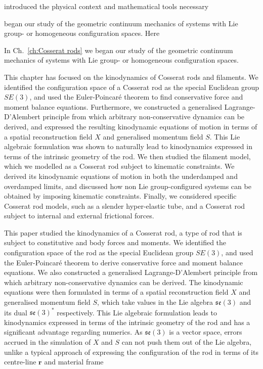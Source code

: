 \documentclass[]{cam-thesis}
\begin{document}
 introduced the physical context and mathematical tools necessary 

began our study of the geometric continuum mechanics of systems with Lie group- or homogeneous configuration spaces. Here 


In Ch.~\ref{ch:Cosserat rods} we began our study of the geometric continuum mechanics of systems with Lie group- or homogeneous configuration spaces. 

This chapter has focused on the kinodynamics of Cosserat rods and filaments. We identified the configuration space of a Cosserat rod as the special Euclidean group $SE(3)$, and used the Euler-Poincaré theorem to find conservative force and moment balance equations. Furthermore, we constructed a generalised Lagrange-D'Alembert principle from which arbitrary non-conservative dynamics can be derived, and expressed the resulting kinodynamic equations of motion in terms of a spatial reconstruction field $X$ and generalised momentum field $S$. This Lie algebraic formulation was shown to naturally lead to kinodynamics expressed in terms of the intrinsic geometry of the rod. We then studied the filament model, which we modelled as a Cosserat rod subject to kinematic constraints. We derived its kinodynamic equations of motion in both the underdamped and overdamped limits, and discussed how non Lie group-configured systems can be obtained by imposing kinematic constraints. Finally, we considered specific Cosserat rod models, such as a slender hyper-elastic tube, and a Cosserat rod subject to internal and external frictional forces.


This paper studied the kinodynamics of a Cosserat rod, a type of rod that is subject to constitutive and body forces and moments. We identified the configuration space of the rod as the special Euclidean group $SE(3)$, and used the Euler-Poincaré theorem to derive conservative force and moment balance equations. We also constructed a generalised Lagrange-D'Alembert principle from which arbitrary non-conservative dynamics can be derived. The kinodynamic equations were then formulated in terms of a spatial reconstruction field $X$ and generalised momentum field $S$, which take values in the Lie algebra $\mathfrak{se}(3)$ and its dual $\mathfrak{se}(3)^*$ respectively. This Lie algebraic formulation leads to kinodynamics expressed in terms of the intrinsic geometry of the rod and has a significant advantage regarding numerics. As $\mathfrak{se}(3)$ is a vector space, errors accrued in the simulation of $X$ and $S$ can not push them out of the Lie algebra, unlike a typical approach of expressing the configuration of the rod in terms of its centre-line $\mathbf{r}$ and material frame 
\end{document}
